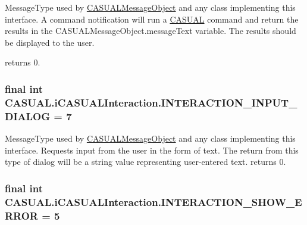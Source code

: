 Message\-Type used by \hyperlink{classCASUAL_1_1CASUALMessageObject}{C\-A\-S\-U\-A\-L\-Message\-Object} and any class implementing this interface. A command notification will run a \hyperlink{namespaceCASUAL}{C\-A\-S\-U\-A\-L} command and return the results in the C\-A\-S\-U\-A\-L\-Message\-Object.\-message\-Text variable. The results should be displayed to the user.

returns 0. \hypertarget{interfaceCASUAL_1_1iCASUALInteraction_a96a9320c51af617e4bef953bb055c244}{
\subsubsection[{I\-N\-T\-E\-R\-A\-C\-T\-I\-O\-N\-\_\-\-I\-N\-P\-U\-T\-\_\-\-D\-I\-A\-L\-O\-G}]{\setlength{\rightskip}{0pt plus 5cm}final int C\-A\-S\-U\-A\-L.\-i\-C\-A\-S\-U\-A\-L\-Interaction.\-I\-N\-T\-E\-R\-A\-C\-T\-I\-O\-N\-\_\-\-I\-N\-P\-U\-T\-\_\-\-D\-I\-A\-L\-O\-G = 7}}\label{interfaceCASUAL_1_1iCASUALInteraction_a96a9320c51af617e4bef953bb055c244}
Message\-Type used by \hyperlink{classCASUAL_1_1CASUALMessageObject}{C\-A\-S\-U\-A\-L\-Message\-Object} and any class implementing this interface. Requests input from the user in the form of text. The return from this type of dialog will be a string value representing user-\/entered text. returns 0. \hypertarget{interfaceCASUAL_1_1iCASUALInteraction_aaf019b0daffee32f5c487ee69a0c2886}{
\subsubsection[{I\-N\-T\-E\-R\-A\-C\-T\-I\-O\-N\-\_\-\-S\-H\-O\-W\-\_\-\-E\-R\-R\-O\-R}]{\setlength{\rightskip}{0pt plus 5cm}final int C\-A\-S\-U\-A\-L.\-i\-C\-A\-S\-U\-A\-L\-Interaction.\-I\-N\-T\-E\-R\-A\-C\-T\-I\-O\-N\-\_\-\-S\-H\-O\-W\-\_\-\-E\-R\-R\-O\-R = 5}}\label{interfaceCASUAL_1_1iCASUALInteraction_aaf019b0daffee32f5c487ee69a0c2886}
